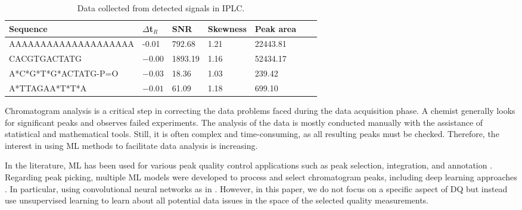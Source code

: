 \begin{table}
\setlength{\tabcolsep}{5 pt}
\centering
\caption{Data collected from detected signals in IPLC.}
\label{tab:signalsdata}
\begin{tabular}{lllllll}
\toprule
\textbf{Sequence}& \textbf{$\Delta$t$_R$} & \textbf{SNR} & \textbf{Skewness} & \textbf{Peak area}\\
\midrule
AAAAAAAAAAAAAAAAAAAA & -0.01 & 792.68 & 1.21 & 22443.81\\
CACGTGACTATG& $-0.00$ & 1893.19&	1.16& 52434.17 \\
A*C*G*T*G*ACTATG-P=O & $-0.03$&	18.36&	1.03&	239.42\\
A*TTAGAA*T*T*A & $-0.01$ &	61.09 &	1.18 & 699.10\\
\bottomrule
\end{tabular}
\end{table}

Chromatogram analysis is a critical step in correcting the data problems faced during the data acquisition phase. A chemist generally looks for significant peaks and observes failed experiments. The analysis of the data is mostly conducted manually with the assistance of statistical and mathematical tools. Still, it is often complex and time-consuming, as all resulting peaks must be checked. Therefore, the interest in using ML methods to facilitate data analysis is increasing.

In the literature, ML has been used for various peak quality control applications such as peak selection, integration, and annotation \cite{Liebal2020}. Regarding peak picking, multiple ML models were developed to process and select chromatogram peaks, including deep learning approaches \cite{Liebal2020}. In particular, using convolutional neural networks as in \cite{RISUM2019,ZHANG2019}. However, in this paper, we do not focus on a specific aspect of DQ but instead use unsupervised learning to learn about all potential data issues in the space of the selected quality measurements. 

